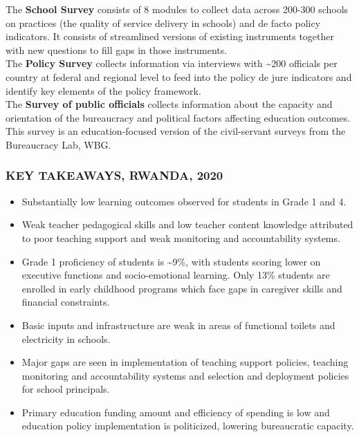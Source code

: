 \documentclass[twocolumn]{article}
\providecommand{\tightlist}{%
  \setlength{\itemsep}{0pt}\setlength{\parskip}{0pt}}
\begin{document}
The \textbf{School Survey} consists of 8 modules to collect data across
200-300 schools on practices (the quality of service delivery in
schools) and de facto policy indicators. It consists of streamlined
versions of existing instruments together with new questions to fill
gaps in those instruments.\\
The \textbf{Policy Survey} collects information via interviews with
\textasciitilde{}200 officials per country at federal and regional level
to feed into the policy de jure indicators and identify key elements of
the policy framework.\\
The \textbf{Survey of public officials} collects information about the
capacity and orientation of the bureaucracy and political factors
affecting education outcomes. This survey is an education-focused
version of the civil-servant surveys from the Bureaucracy Lab, WBG.

\hypertarget{key-takeaways-2020}{%
\subsubsection{\texorpdfstring{\textbf{KEY TAKEAWAYS,
\uppercase{Rwanda},
2020}}{KEY TAKEAWAYS, , 2020}}\label{key-takeaways-2020}}

\begin{itemize}
\tightlist
\item
  Substantially low learning outcomes observed for students in Grade 1
  and 4.
\item
  Weak teacher pedagogical skills and low teacher content knowledge
  attributed to poor teaching support and weak monitoring and
  accountability systems.
\item
  Grade 1 proficiency of students is \textasciitilde{}9\%, with students
  scoring lower on executive functions and socio-emotional learning.
  Only 13\% students are enrolled in early childhood programs which face
  gaps in caregiver skills and financial constraints.
\item
  Basic inputs and infrastructure are weak in areas of functional
  toilets and electricity in schools.
\item
  Major gaps are seen in implementation of teaching support policies,
  teaching monitoring and accountability systems and selection and
  deployment policies for school principals.
\item
  Primary education funding amount and efficiency of spending is low and
  education policy implementation is politicized, lowering bureaucratic
  capacity.
\end{itemize}
\end{document}
